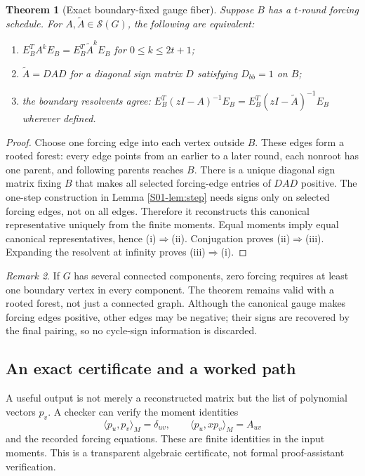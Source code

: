 \documentclass[11pt,a4paper]{article}
\newtheorem{theorem}{Theorem}[section]
\theoremstyle{definition}\newtheorem{definition}[theorem]{Definition}
\theoremstyle{remark}\newtheorem{remark}[theorem]{Remark}
\numberwithin{equation}{section}
\begin{document}
\begin{theorem}[Exact boundary-fixed gauge fiber]\label{S01-thm:gauge}
Suppose $B$ has a $t$-round forcing schedule. For $A,\widetilde A\in\mathcal S(G)$, the following are equivalent:
\begin{enumerate}[label=(\roman*)]
 \item $E_B^TA^kE_B=E_B^T\widetilde A^kE_B$ for $0\le k\le2t+1$;
 \item $\widetilde A=DAD$ for a diagonal sign matrix $D$ satisfying $D_{bb}=1$ on $B$;
 \item the boundary resolvents agree: $E_B^T(zI-A)^{-1}E_B=E_B^T(zI-\widetilde A)^{-1}E_B$ wherever defined.
\end{enumerate}
\end{theorem}
\begin{proof}
Choose one forcing edge into each vertex outside $B$. These edges form a rooted forest: every edge points from an earlier to a later round, each nonroot has one parent, and following parents reaches $B$. There is a unique diagonal sign matrix fixing $B$ that makes all selected forcing-edge entries of $DAD$ positive. The one-step construction in Lemma \ref{S01-lem:step} needs signs only on selected forcing edges, not on all edges. Therefore it reconstructs this canonical representative uniquely from the finite moments. Equal moments imply equal canonical representatives, hence (i)$\Rightarrow$(ii). Conjugation proves (ii)$\Rightarrow$(iii). Expanding the resolvent at infinity proves (iii)$\Rightarrow$(i).
\end{proof}

\begin{remark}
If $G$ has several connected components, zero forcing requires at least one boundary vertex in every component. The theorem remains valid with a rooted forest, not just a connected graph. Although the canonical gauge makes forcing edges positive, other edges may be negative; their signs are recovered by the final pairing, so no cycle-sign information is discarded.
\end{remark}

\subsection{An exact certificate and a worked path}\label{S01-sec-4}
A useful output is not merely a reconstructed matrix but the list of polynomial vectors $p_v$. A checker can verify the moment identities
\[
 \langle p_u,p_v\rangle_M=\delta_{uv},\qquad
 \langle p_u,xp_v\rangle_M=A_{uv}
\]
and the recorded forcing equations. These are finite identities in the input moments. This is a transparent algebraic certificate, not formal proof-assistant verification.
\end{document}
